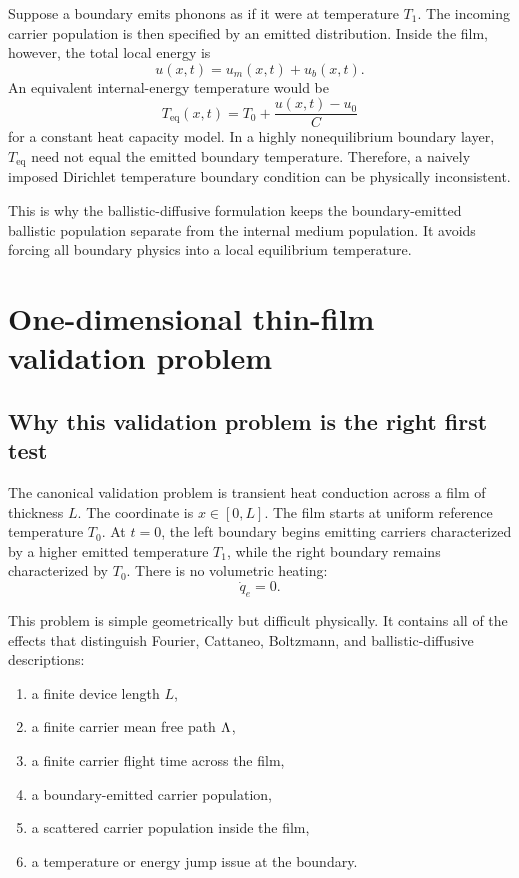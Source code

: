 \documentclass[11pt]{article}
\begin{document}
Suppose a boundary emits phonons as if it were at temperature \(T_1\). The incoming carrier population is then specified by an emitted distribution. Inside the film, however, the total local energy is
\begin{equation}
    u(x,t)=u_m(x,t)+u_b(x,t).
\end{equation}
An equivalent internal-energy temperature would be
\begin{equation}
    T_{\mathrm{eq}}(x,t)=T_0+\frac{u(x,t)-u_0}{C}
\end{equation}
for a constant heat capacity model. In a highly nonequilibrium boundary layer, \(T_{\mathrm{eq}}\) need not equal the emitted boundary temperature. Therefore, a naively imposed Dirichlet temperature boundary condition can be physically inconsistent.

This is why the ballistic-diffusive formulation keeps the boundary-emitted ballistic population separate from the internal medium population. It avoids forcing all boundary physics into a local equilibrium temperature.


\section{One-dimensional thin-film validation problem}
\subsection{Why this validation problem is the right first test}
The canonical validation problem is transient heat conduction across a film of thickness \(L\). The coordinate is \(x\in[0,L]\). The film starts at uniform reference temperature \(T_0\). At \(t=0\), the left boundary begins emitting carriers characterized by a higher emitted temperature \(T_1\), while the right boundary remains characterized by \(T_0\). There is no volumetric heating:
\begin{equation}
    \dot{q}_e=0.
\end{equation}

This problem is simple geometrically but difficult physically. It contains all of the effects that distinguish Fourier, Cattaneo, Boltzmann, and ballistic-diffusive descriptions:
\begin{enumerate}[leftmargin=1.6em]
    \item a finite device length \(L\),
    \item a finite carrier mean free path \(\Lambda\),
    \item a finite carrier flight time across the film,
    \item a boundary-emitted carrier population,
    \item a scattered carrier population inside the film,
    \item a temperature or energy jump issue at the boundary.
\end{enumerate}
\end{document}
